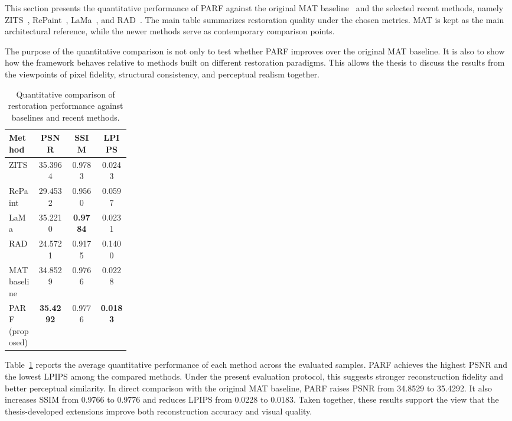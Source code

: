 \documentclass[12pt, twoside]{report}
\begin{document}
This section presents the quantitative performance of PARF against the original MAT baseline~\cite{li2022mat} and the selected recent methods, namely ZITS~\cite{zeng2022zits}, RePaint~\cite{lugmayr2022repaint}, LaMa~\cite{suvorov2022lama}, and RAD~\cite{kim2025rad}. The main table summarizes restoration quality under the chosen metrics. MAT is kept as the main architectural reference, while the newer methods serve as contemporary comparison points.

The purpose of the quantitative comparison is not only to test whether PARF improves over the original MAT baseline. It is also to show how the framework behaves relative to methods built on different restoration paradigms. This allows the thesis to discuss the results from the viewpoints of pixel fidelity, structural consistency, and perceptual realism together.

\begin{table}[H]
\centering
\caption{Quantitative comparison of restoration performance against baselines and recent methods.}
\label{tab:quant_results}
\begin{tabular}{p{0.24\linewidth} c c c}
\toprule
\textbf{Method} & \textbf{PSNR} & \textbf{SSIM} & \textbf{LPIPS} \\
\midrule
ZITS & 35.3964 & 0.9783 & 0.0243 \\
RePaint & 29.4532 & 0.9560 & 0.0597 \\
LaMa & 35.2210 & \textbf{0.9784} & 0.0231 \\
RAD & 24.5721 & 0.9175 & 0.1400 \\
MAT baseline & 34.8529 & 0.9766 & 0.0228 \\
PARF (proposed) & \textbf{35.4292} & 0.9776 & \textbf{0.0183} \\
\bottomrule
\end{tabular}
\end{table}

Table~\ref{tab:quant_results} reports the average quantitative performance of each method across the evaluated samples. PARF achieves the highest PSNR and the lowest LPIPS among the compared methods. Under the present evaluation protocol, this suggests stronger reconstruction fidelity and better perceptual similarity. In direct comparison with the original MAT baseline, PARF raises PSNR from 34.8529 to 35.4292. It also increases SSIM from 0.9766 to 0.9776 and reduces LPIPS from 0.0228 to 0.0183. Taken together, these results support the view that the thesis-developed extensions improve both reconstruction accuracy and visual quality.
\end{document}
